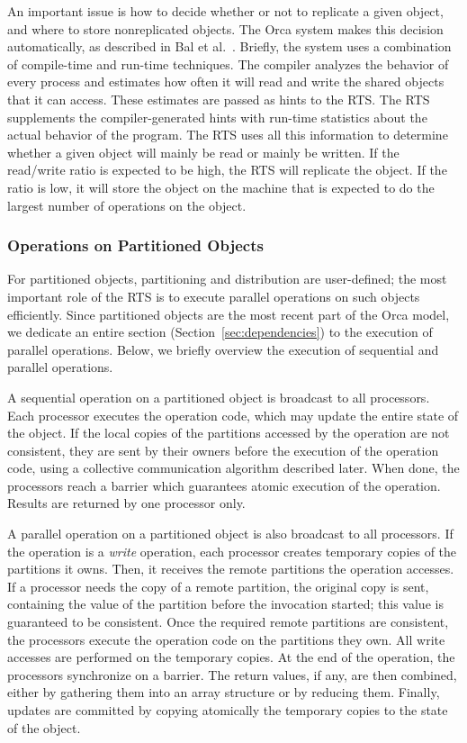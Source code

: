 \documentclass{acmtrans2e}
\begin{document}
An important issue is how to decide whether or not to replicate a
given object, and where to store nonreplicated objects.  The Orca
system makes this decision automatically, as described
in Bal et al.~\citeyear{Bal:1998}.
Briefly, the system uses a combination of
compile-time and run-time techniques. The compiler analyzes the
behavior of every process and estimates how often it will read and
write the shared objects that it can access. These estimates are
passed as hints to the RTS.  The RTS supplements the
compiler-generated hints with run-time statistics about the actual
behavior of the program.  The RTS uses all this information to
determine whether a given object will mainly be read or mainly be
written.  If the read/write ratio is expected to be high, the RTS will
replicate the object. If the ratio is low, it will store the object on
the machine that is expected to do the largest number of operations on
the object.

\subsubsection{Operations on Partitioned Objects}
\label{sec:partobjects}

For partitioned objects, partitioning and distribution are
user-defined; the most important role of the RTS is to execute
parallel operations on such objects efficiently. Since partitioned
objects are the most recent part of the Orca model, we dedicate an
entire section (Section~\ref{sec:dependencies}) to the execution of
parallel operations. Below, we briefly overview the execution of
sequential and parallel operations.

A sequential operation on a partitioned object is broadcast to all
processors. Each processor executes the operation code, which may
update the entire state of the object. If the local copies of the
partitions accessed by the operation are not consistent, they are
sent by their owners before the execution of the operation code,
using a collective communication algorithm described later.
When done, the processors reach a
barrier which guarantees atomic execution of the operation. Results
are returned by one processor only.

A parallel operation on a partitioned object is also broadcast to all
processors. If the operation is a {\em write} operation, each
processor creates temporary copies of the partitions it owns. Then, it
receives the remote partitions the operation accesses. If a processor
needs the copy of a remote partition, the original copy is sent,
containing the value of the partition before the invocation
started; this value is guaranteed to be consistent. Once the required remote
partitions are consistent, the processors execute the
operation code on the partitions they own. All write accesses are
performed on the temporary copies. At the end of the operation, the
processors synchronize on a barrier. The return values, if any, are
then combined, either by gathering them into an array structure or by
reducing them.  Finally, updates are committed by copying atomically
the temporary copies to the state of the object.
\end{document}
